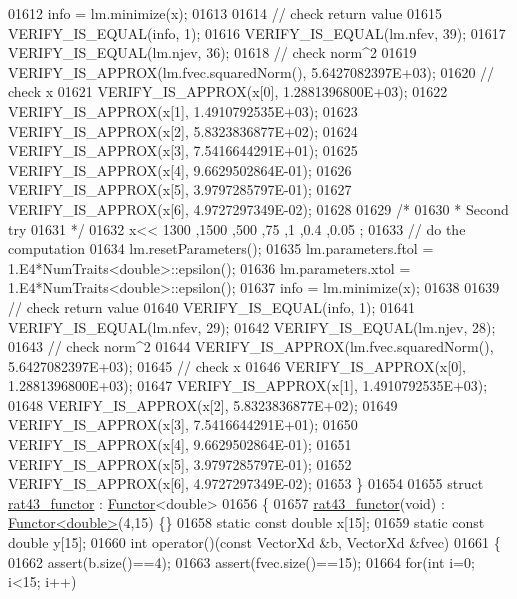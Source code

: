 \begin{DoxyCode}
01612   info = lm.minimize(x);
01613 
01614   \textcolor{comment}{// check return value}
01615   VERIFY\_IS\_EQUAL(info, 1);
01616   VERIFY\_IS\_EQUAL(lm.nfev, 39);
01617   VERIFY\_IS\_EQUAL(lm.njev, 36);
01618   \textcolor{comment}{// check norm^2}
01619   VERIFY\_IS\_APPROX(lm.fvec.squaredNorm(), 5.6427082397E+03);
01620   \textcolor{comment}{// check x}
01621   VERIFY\_IS\_APPROX(x[0], 1.2881396800E+03);
01622   VERIFY\_IS\_APPROX(x[1], 1.4910792535E+03);
01623   VERIFY\_IS\_APPROX(x[2], 5.8323836877E+02);
01624   VERIFY\_IS\_APPROX(x[3], 7.5416644291E+01);
01625   VERIFY\_IS\_APPROX(x[4], 9.6629502864E-01);
01626   VERIFY\_IS\_APPROX(x[5], 3.9797285797E-01);
01627   VERIFY\_IS\_APPROX(x[6], 4.9727297349E-02);
01628 
01629   \textcolor{comment}{/*}
01630 \textcolor{comment}{   * Second try}
01631 \textcolor{comment}{   */}
01632   x<< 1300 ,1500 ,500  ,75   ,1    ,0.4  ,0.05  ;
01633   \textcolor{comment}{// do the computation}
01634   lm.resetParameters();
01635   lm.parameters.ftol = 1.E4*NumTraits<double>::epsilon();
01636   lm.parameters.xtol = 1.E4*NumTraits<double>::epsilon();
01637   info = lm.minimize(x);
01638 
01639   \textcolor{comment}{// check return value}
01640   VERIFY\_IS\_EQUAL(info, 1);
01641   VERIFY\_IS\_EQUAL(lm.nfev, 29);
01642   VERIFY\_IS\_EQUAL(lm.njev, 28);
01643   \textcolor{comment}{// check norm^2}
01644   VERIFY\_IS\_APPROX(lm.fvec.squaredNorm(), 5.6427082397E+03);
01645   \textcolor{comment}{// check x}
01646   VERIFY\_IS\_APPROX(x[0], 1.2881396800E+03);
01647   VERIFY\_IS\_APPROX(x[1], 1.4910792535E+03);
01648   VERIFY\_IS\_APPROX(x[2], 5.8323836877E+02);
01649   VERIFY\_IS\_APPROX(x[3], 7.5416644291E+01);
01650   VERIFY\_IS\_APPROX(x[4], 9.6629502864E-01);
01651   VERIFY\_IS\_APPROX(x[5], 3.9797285797E-01);
01652   VERIFY\_IS\_APPROX(x[6], 4.9727297349E-02);
01653 \}
01654 
01655 \textcolor{keyword}{struct }\hyperlink{structrat43__functor}{rat43\_functor} : \hyperlink{struct_functor}{Functor}<double>
01656 \{
01657     \hyperlink{structrat43__functor}{rat43\_functor}(\textcolor{keywordtype}{void}) : \hyperlink{struct_functor}{Functor<double>}(4,15) \{\}
01658     \textcolor{keyword}{static} \textcolor{keyword}{const} \textcolor{keywordtype}{double} x[15];
01659     \textcolor{keyword}{static} \textcolor{keyword}{const} \textcolor{keywordtype}{double} y[15];
01660     \textcolor{keywordtype}{int} operator()(\textcolor{keyword}{const} VectorXd &b, VectorXd &fvec)
01661     \{
01662         assert(b.size()==4);
01663         assert(fvec.size()==15);
01664         \textcolor{keywordflow}{for}(\textcolor{keywordtype}{int} i=0; i<15; i++)

\end{DoxyCode}
